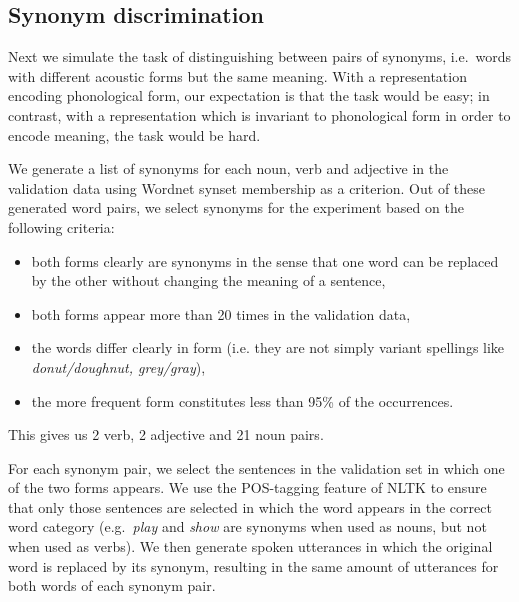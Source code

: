 \subsection{Synonym discrimination}
\label{sec:synonym}

Next we simulate the task of distinguishing between pairs of synonyms, i.e.\ words with different acoustic forms but the same meaning. With a representation encoding phonological form, our expectation is that the task would be easy; in contrast, with a representation which is invariant to phonological form in order to encode meaning, the task would be hard. 

We generate a list of synonyms for each noun, verb and adjective in the validation data using Wordnet \citep{miller1995wordnet} synset membership as a criterion. Out of these generated word pairs, we select synonyms for the experiment based on the following criteria:
\begin{itemize}
\item both forms clearly are synonyms in the sense that one word can be replaced by the other without changing the meaning of a sentence,
\item both forms appear more than 20 times in the validation data, 
\item the words differ clearly in form (i.e. they are not simply variant spellings like {\it donut/doughnut, grey/gray}),
\item the more frequent form constitutes less than 95\% of the occurrences.
\end{itemize}
This gives us 2 verb, 2 adjective and 21 noun pairs.

For each synonym pair, we select the sentences in the validation set in which one of the two forms appears. We use the POS-tagging feature of NLTK \citep{bird2006nltk} to ensure that only those sentences are selected in which the word appears in the correct word category (e.g.\ {\it play} and {\it show} are synonyms when used as nouns, but not when used as verbs). We then generate spoken utterances in which the original word is replaced by its synonym, resulting in the same amount of utterances for both words of each synonym pair.

